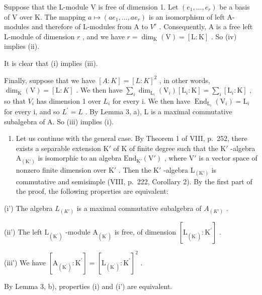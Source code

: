 Suppose that the L-module V is free of dimension 1. Let \((e_{1},\ldots,e_{r})\) be a basis of V over K. The mapping \(a\mapsto(ae_{1},\ldots,ae_{r})\) is an isomorphism of left A-modules and therefore of L-modules from A to \(V^{r}\) . Consequently, A is a free left L-module of dimension \(r\) , and we have \(r = \dim_{\mathrm{K}}(\mathrm{V}) = [\mathrm{L}:\mathrm{K}]\) . So (iv) implies (ii).

It is clear that (i) implies (iii).

Finally, suppose that we have \([A:K]=[L:K]^{2}\) , in other words, \(\dim_{\mathrm{K}}(\mathrm{V})=[\mathrm{L}:K]\) . We then have \(\sum_{i}\dim_{\mathrm{L}_{i}}(\mathrm{V}_{i})[\mathrm{L}_{i}:\mathrm{K}]=\sum_{i}[\mathrm{L}_{i}:\mathrm{K}]\) , so that \(V_{i}\) has dimension 1 over \(L_{i}\) for every i. We then have \(\operatorname{End}_{\mathrm{L}_{i}}(\mathrm{V}_{i})=\mathrm{L}_{i}\) for every i, and so \(L^{\prime}=L\) . By Lemma 3, a), L is a maximal commutative subalgebra of A. So (iii) implies (i).

\begin{enumerate}
\def\labelenumi{\Alph{enumi})}
\setcounter{enumi}{1}
\tightlist
\item
  Let us continue with the general case. By Theorem 1 of VIII, p.~252, there exists a separable extension \(\mathrm{K}'\) of \(\mathrm{K}\) of finite degree such that the \(\mathrm{K}'\) -algebra \(\mathrm{A}_{(\mathrm{K}')}\) is isomorphic to an algebra \(\mathrm{End}_{\mathrm{K}'}(\mathrm{V}')\) , where \(\mathrm{V}'\) is a vector space of nonzero finite dimension over \(\mathrm{K}'\) . Then the \(\mathrm{K}'\) -algebra \(\mathrm{L}_{(\mathrm{K}')}\) is commutative and semisimple (VIII, p.~222, Corollary 2). By the first part of the proof, the following properties are equivalent:
\end{enumerate}

(i') The algebra \(L_{(K')}\) is a maximal commutative subalgebra of \(A_{(K')}\) .

(ii') The left \(\mathrm{L}_{(\mathrm{K}^{\prime})}\) -module \(\mathrm{A}_{(\mathrm{K}^{\prime})}\) is free, of dimension \([\mathrm{L}_{(\mathrm{K}^{\prime})}:\mathrm{K}^{\prime}]\) .

(iii') We have \(\left[\mathrm{A}_{\left(\mathrm{K}^{\prime}\right)}:\mathrm{K}^{\prime}\right] = \left[\mathrm{L}_{\left(\mathrm{K}^{\prime}\right)}:\mathrm{K}^{\prime}\right]^{2}\) .

By Lemma 3, b), properties (i) and (i') are equivalent.

